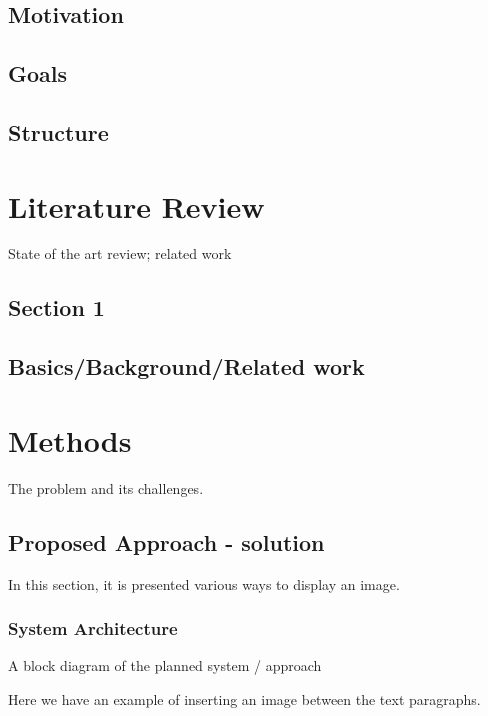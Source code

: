 \documentclass[a4paper]{report}
\begin{document}
        \section{Motivation}
        
        \section{Goals}
        
        \section{Structure}
        


	\chapter{Literature Review}
		State of the art review; related work
        
        
        \section{Section 1}

        
        \section{Basics/Background/Related work}

	\chapter{Methods}
	         The problem and its challenges.

	\section{Proposed Approach - solution}
	In this section, it is presented various ways to display an image.
     \subsection{System Architecture}
     A block diagram of the planned system / approach

	Here we have an example of inserting an image between the text paragraphs.
	
\end{document}
